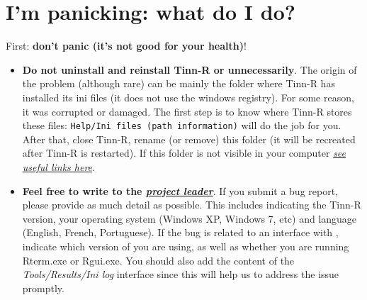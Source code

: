 
\section{I'm panicking: what do I do?}

First: \textbf{don't panic (it's not good for your health)}!

\begin{itemize}
\item \textbf{Do not uninstall and reinstall Tinn-R or \RR{} unnecessarily}.
  The origin of the problem (although rare) can be mainly the folder where Tinn-R has installed its ini files
  (it does not use the windows registry). For some reason, it was corrupted or damaged.
  The first step is to know where Tinn-R stores these files: \texttt{Help/Ini files (path information)}
  will do the job for you. After that, close Tinn-R,
  rename (or remove) this folder (it will be recreated after Tinn-R is restarted).
  If this folder is not visible in your computer \textit{\href{\#faq\_trpaths}{see useful links here}}.
\item \textbf{Feel free to write to the \textit{\href{mailto:joseclaudio.faria@gmail.com}{project leader}}}.
  If you submit a bug report, please provide as much detail as possible.
  This includes indicating the Tinn-R version, your operating system (Windows XP, Windows 7, etc) and
  language (English, French, Portuguese). If the bug is related to an interface with \RR{},
  indicate which version of \RR{} you are using, as well as whether you are running Rterm.exe or Rgui.exe.
  You should also add the content of the \textit{Tools/Results/Ini log}
  interface since this will help us to address the issue promptly.
\end{itemize}
